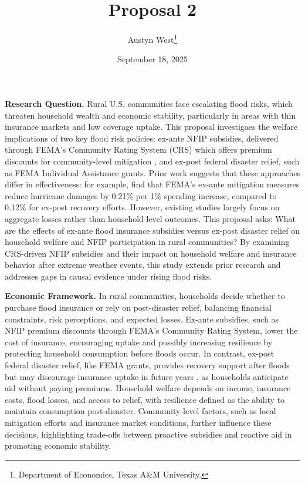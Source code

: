 


\begin{singlespace}
\title{Proposal 2}
\author{Austyn West\thanks{Department of Economics, Texas A\&M University.}}
\date{September 18, 2025}
\maketitle
\end{singlespace}

\textbf{Research Question.} Rural U.S. communities face escalating flood risks, which threaten household wealth and economic stability, particularly in areas with thin insurance markets and low coverage uptake. This proposal investigaes the welfare implications of two key flood risk policies: ex-ante NFIP subsidies, delivered through FEMA’s Community Rating System (CRS) which offers premium discounts for community-level mitigation \citep{CommunityRatingSystem2020}, and ex-post federal disaster relief, such as FEMA Individual Assistance grants. Prior work suggests that these approaches differ in effectiveness: for example, \citet{Davlasheridze2017} find that FEMA’s ex-ante mitigation measures reduce hurricane damages by 0.21\% per 1\% spending increase, compared to 0.12\% for ex-post recovery efforts. However, existing studies largely focus on aggregate losses rather than household-level outcomes. This proposal asks: What are the effects of ex-ante flood insurance subsidies versus ex-post disaster relief on household welfare and NFIP participation in rural communities? By examining CRS-driven NFIP subsidies and their impact on household welfare and insurance behavior after extreme weather events, this study extends prior research and addresses gaps in causal evidence under rising flood risks.

\textbf{Economic Framework.} In rural communities, households decide whether to purchase flood insurance or rely on post-disaster relief, balancing financial constraints, risk perceptions, and expected losses. Ex-ante subsidies, such as NFIP premium discounts through FEMA’s Community Rating System, lower the cost of insurance, encouraging uptake and possibly increasing resilience by protecting household consumption before floods occur. In contrast, ex-post federal disaster relief, like FEMA grants, provides recovery support after floods but may discourage insurance uptake in future years \citep{Kousky2018}, as households anticipate aid without paying premiums. Household welfare depends on income, insurance costs, flood losses, and access to relief, with resilience defined as the ability to maintain consumption post-disaster. Community-level factors, such as local mitigation efforts and insurance market conditions, further influence these decisions, highlighting trade-offs between proactive subsidies and reactive aid in promoting economic stability.


